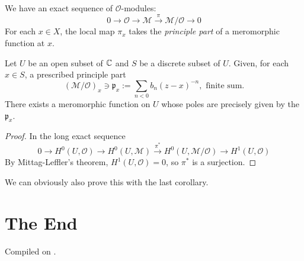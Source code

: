 \documentclass{article}
\begin{document}
We have an exact sequence of $\mathcal{O}$-modules:
\[
    0 \longrightarrow \mathcal{O} \longrightarrow \mathcal{M} \xrightarrow{\ \pi\ } \mathcal{M}/\mathcal{O} \longrightarrow 0
\]
For each $x\in X$, the local map $\pi_x$ takes the \emph{principle part} of a meromorphic function at $x$.

\begin{theorem}
    Let $U$ be an open subset of $\mathbb{C}$ and $S$ be a discrete subset of $U$. Given, for each $x\in S$, a prescribed principle part
    \[
        (\mathcal{M}/\mathcal{O})_x \ni \mathfrak{p}_x := \sum_{n<0}b_n(z-x)^{-n},\text{ finite sum}.
    \]
    There exists a meromorphic function on $U$ whose poles are precisely given by the $\mathfrak{p}_x$.
\end{theorem}

\begin{proof}
    In the long exact sequence
    \[
        0 \longrightarrow H^0(U,\mathcal{O}) \longrightarrow H^0(U,\mathcal{M}) \xrightarrow{\ \pi^*\ } H^0(U,\mathcal{M}/\mathcal{O}) \longrightarrow H^1(U,\mathcal{O})
    \]
    By Mittag-Leffler's theorem, $H^1(U,\mathcal{O})=0$, so $\pi^*$ is a surjection.
\end{proof}

\begin{remark}
    We can obviously also prove this with the last corollary.
\end{remark}

\section*{The End}



\noindent Compiled on \todayymd.

\noindent\home
\end{document}
